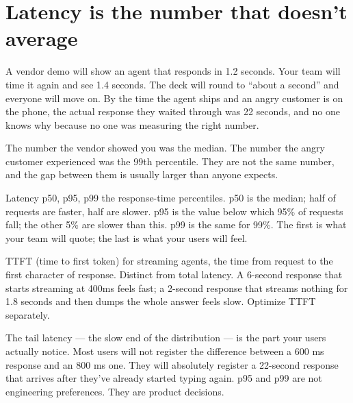 \label{ch:30-benchmarking-11-speed-cost}

\starttwocol

\section{Latency is the number that doesn't average}

A vendor demo will show an agent that responds in 1.2 seconds. Your team will time it again and see 1.4 seconds. The deck will round to ``about a second'' and everyone will move on. By the time the agent ships and an angry customer is on the phone, the actual response they waited through was 22 seconds, and no one knows why because no one was measuring the right number.

The number the vendor showed you was the median. The number the angry customer experienced was the 99th percentile. They are not the same number, and the gap between them is usually larger than anyone expects.

\begin{TNdefinition}{Latency p50, p95, p99} the response-time percentiles. p50 is the median; half of requests are faster, half are slower. p95 is the value below which 95\% of requests fall; the other 5\% are slower than this. p99 is the same for 99\%. The first is what your team will quote; the last is what your users will feel. \end{TNdefinition}

\begin{TNdefinition}{TTFT (time to first token)} for streaming agents, the time from request to the first character of response. Distinct from total latency. A 6-second response that starts streaming at 400ms feels fast; a 2-second response that streams nothing for 1.8 seconds and then dumps the whole answer feels slow. Optimize TTFT separately. \end{TNdefinition}

The tail latency --- the slow end of the distribution --- is the part your users actually notice. Most users will not register the difference between a 600 ms response and an 800 ms one. They will absolutely register a 22-second response that arrives after they've already started typing again. p95 and p99 are not engineering preferences. They are product decisions.

